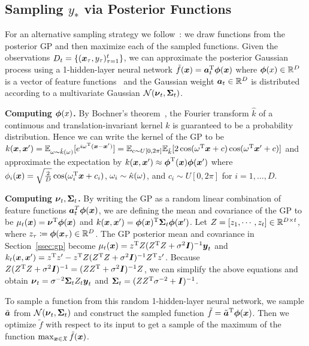 \subsection{Sampling $y_*$ via Posterior Functions}
For an alternative sampling strategy we follow~\cite{hernandez2014predictive}: we draw functions from the posterior GP and then maximize each of the sampled functions.
%
Given the observations $D_t = \{({\boldsymbol{x}}_\tau, y_\tau)_{\tau=1}^t\}$, we can approximate the posterior Gaussian process using a 1-hidden-layer neural network $\tilde f({\boldsymbol{x}}) = \boldsymbol{a}_t^{\textrm T} \boldsymbol{\phi}({\boldsymbol{x}})$ where $\boldsymbol{\phi}(x)\in \mathbb{R}^D$ is a vector of feature functions~\cite{neal96,rahimi2007random}
%
and the Gaussian weight $\boldsymbol{a}_t\in\mathbb{R}^D$ is distributed according to a multivariate Gaussian $\mathcal N({\boldsymbol{\nu}}_t, \boldsymbol{\Sigma}_t)$.

\textbf{Computing $\boldsymbol{\phi}(x)$.} By Bochner's theorem~\cite{rudin2011fourier}, the Fourier transform $\hat k$ of a continuous and translation-invariant kernel $k$ is guaranteed to be a probability distribution. Hence we can write the kernel of the GP to be $k({\boldsymbol{x}},{\boldsymbol{x}}') = \mathbb E_{\omega\sim\hat k(\omega)}[e^{i\omega^{\textrm T} ({\boldsymbol{x}}-{\boldsymbol{x}}')}] =\mathbb E_{c\sim U[0,2\pi]} \mathbb E_{\hat k} [2 \cos(\omega^{\textrm T} {\boldsymbol{x}} + c)\cos(\omega^{\textrm T} {\boldsymbol{x}}' + c)]$ and approximate the expectation by $k({\boldsymbol{x}},{\boldsymbol{x}}')\approx \boldsymbol{\phi}^{\textrm T}({\boldsymbol{x}})\boldsymbol{\phi}({\boldsymbol{x}}')$ where $\phi_i({\boldsymbol{x}}) = \sqrt{\frac2D} \cos(\omega_i^{\textrm T} {\boldsymbol{x}} + c_i)$, $\omega_i\sim \hat {\kappa}(\omega)$, and $c_i \sim U[0,2\pi]$ for $i = 1,\dots, D$.

\textbf{Computing ${\boldsymbol{\nu}}_t, \boldsymbol{\Sigma}_t$.} By writing the GP as a random linear combination of feature functions $\boldsymbol{a}^T_t\boldsymbol{\phi}({\boldsymbol{x}})$, we are defining the mean and covariance of the GP to be $\mu_t({\boldsymbol{x}}) = {\boldsymbol{\nu}}^{\textrm T} \boldsymbol{\phi}({\boldsymbol{x}})$ and $k({\boldsymbol{x}},{\boldsymbol{x}}') = \boldsymbol{\phi}({\boldsymbol{x}})^{\textrm T}\boldsymbol{\Sigma}_t\boldsymbol{\phi}({\boldsymbol{x}}')$. Let $Z = [z_1, \cdots, z_t] \in \mathbb{R}^{D\times t}$, where $z_\tau \coloneqq \boldsymbol{\phi} ({\boldsymbol{x}}_\tau) \in \mathbb{R}^D$. 
The GP posterior mean and covariance in Section~\ref{ssec:gp} become
$\mu_t({\boldsymbol{x}}) = z^{\textrm T} Z (Z^{\textrm T} Z + \sigma^2 \boldsymbol{I})^{-1} \boldsymbol{y}_t$ and 
$k_t ({\boldsymbol{x}}, {\boldsymbol{x}}')= z^{\textrm T} z' - z^{\textrm T} Z (Z^{\textrm T} Z + \sigma^2 \boldsymbol{I})^{-1} Z^{\textrm T} z'$. 
Because $Z(Z^{\textrm T} Z + \sigma^2 \boldsymbol{I})^{-1} = (ZZ^{\textrm T} +\sigma^2 \boldsymbol{I})^{-1}Z$, we can simplify the above equations and obtain ${\boldsymbol{\nu}}_t = \sigma^{-2}\boldsymbol{\Sigma}_t Z_t\boldsymbol{y}_t $ and $\boldsymbol{\Sigma}_t = (Z Z^{\textrm T} \sigma^{-2} +\boldsymbol{I})^{-1}$.
%


To sample a function from this random 1-hidden-layer neural network, we sample $\tilde {\boldsymbol{a}}$ from $\mathcal N({\boldsymbol{\nu}}_t, \boldsymbol{\Sigma}_t)$ and construct the sampled function $\tilde f = \tilde {\boldsymbol{a}}^{\textrm T} \boldsymbol{\phi}({\boldsymbol{x}})$. Then we optimize $\tilde f$ with respect to its input to get a sample of the maximum of the function $\max_{{\boldsymbol{x}}\in\mathfrak X} \tilde f({\boldsymbol{x}})$. 



